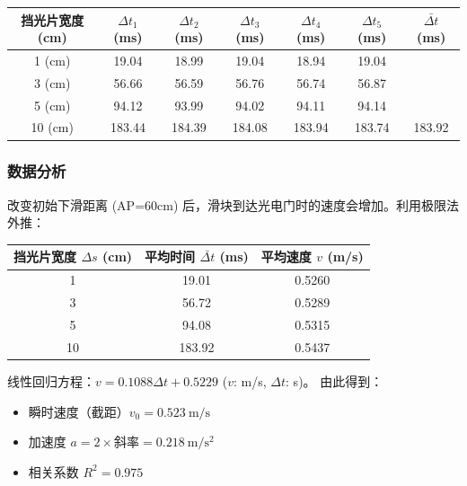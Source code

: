 \documentclass[11pt]{article}
\begin{document}
\begin{table}[h]
    \centering
    \begin{tabular}{ccccccc}
        \toprule
        挡光片宽度 (cm) & $\Delta t_1$ (ms) & $\Delta t_2$ (ms) & $\Delta t_3$ (ms) & $\Delta t_4$ (ms) & $\Delta t_5$ (ms) & $\bar{\Delta t}$ (ms) \\
        \midrule
        1 (cm)  & 19.04  & 18.99  & 19.04  & 18.94  & 19.04  & \\
        3 (cm)  & 56.66  & 56.59  & 56.76  & 56.74  & 56.87  & \\
        5 (cm)  & 94.12  & 93.99  & 94.02  & 94.11  & 94.14  & \\
        10 (cm) & 183.44 & 184.39 & 184.08 & 183.94 & 183.74 & 183.92 \\
        \bottomrule
    \end{tabular}
\end{table}

\subsubsection{数据分析}
改变初始下滑距离 (AP=60cm) 后，滑块到达光电门时的速度会增加。利用极限法外推：
\begin{table}[H]
    \centering
    \begin{tabular}{ccc}
        \toprule
        挡光片宽度 $\Delta s$ (cm) & 平均时间 $\bar{\Delta t}$ (ms) & 平均速度 $v$ (m/s) \\
        \midrule
        1 & 19.01 & 0.5260 \\
        3 & 56.72 & 0.5289 \\
        5 & 94.08 & 0.5315 \\
        10 & 183.92 & 0.5437 \\
        \bottomrule
    \end{tabular}
\end{table}

线性回归方程：$v = 0.1088 \Delta t + 0.5229$ ($v$: m/s, $\Delta t$: s)。
由此得到：
\begin{itemize}
    \item 瞬时速度（截距）$v_0 = 0.523\ \mathrm{m/s}$
    \item 加速度 $a = 2 \times \text{斜率} = 0.218\ \mathrm{m/s^2}$
    \item 相关系数 $R^2 = 0.975$
\end{itemize}
\end{document}
